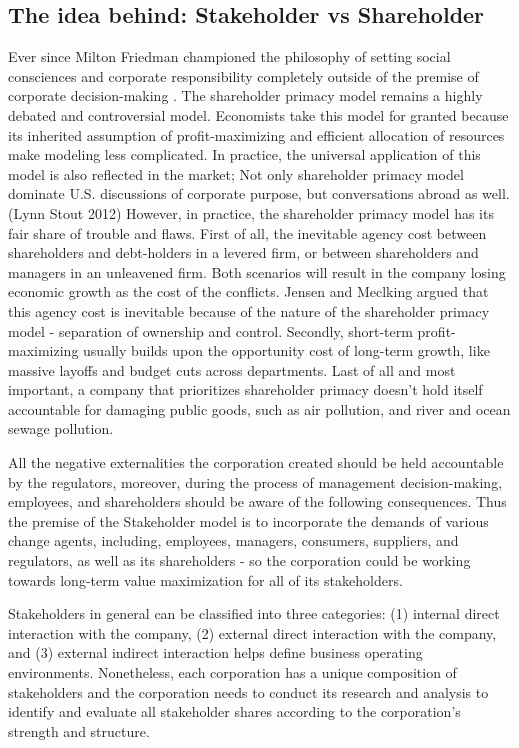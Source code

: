 \documentclass[a4paper, 12pt]{article}
\begin{document}
\subsection{The idea behind: Stakeholder vs Shareholder}
\vspace{-10pt}
  \hspace{12pt} Ever since Milton Friedman championed the philosophy of setting social consciences and corporate responsibility completely outside of the premise of corporate decision-making \cite{Milton}. The shareholder primacy model remains a highly debated and controversial model. Economists take this model for granted because its inherited assumption of profit-maximizing and efficient allocation of resources make modeling less complicated. In practice, the universal application of this model is also reflected in the market; Not only shareholder primacy model dominate U.S. discussions of corporate purpose, but conversations abroad as well. (Lynn Stout  2012)\cite{Lynn} However, in practice, the shareholder primacy model has its fair share of trouble and flaws. First of all, the inevitable agency cost between shareholders and debt-holders in a levered firm, or between shareholders and managers in an unleavened firm. Both scenarios will result in the company losing economic growth as the cost of the conflicts. Jensen and Meclking argued that this agency cost is inevitable because of the nature of the shareholder primacy model - separation of ownership and control.\cite{Jensen} Secondly, short-term profit-maximizing usually builds upon the opportunity cost of long-term growth, like massive layoffs and budget cuts across departments. Last of all and most important, a company that prioritizes shareholder primacy doesn't hold itself accountable for damaging public goods, such as air pollution, and river and ocean sewage pollution. 
 
 All the negative externalities the corporation created should be held accountable by the regulators, moreover, during the process of management decision-making, employees, and shareholders should be aware of the following consequences. Thus the premise of the Stakeholder model is to incorporate the demands of various change agents, including, employees, managers, consumers, suppliers, and regulators, as well as its shareholders - so the corporation could be working towards long-term value maximization for all of its stakeholders. 

 Stakeholders in general can be classified into three categories: (1) internal direct interaction with the company, (2) external direct interaction with the company, and (3) external indirect interaction helps define business operating environments. \cite{McKinsey} Nonetheless, each corporation has a unique composition of stakeholders and the corporation needs to conduct its research and analysis to identify and evaluate all stakeholder shares according to the corporation's strength and structure.  
\end{document}
